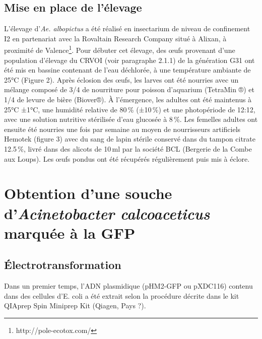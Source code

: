 \subsection{Mise en place de l'élevage}

L'élevage d'\textit{Ae. albopictus} a été réalisé en insectarium de niveau de confinement I2 en partenariat avec la Rovaltain Research Company situé à Alixan, à proximité de Valence\footnote{http://pole-ecotox.com/}. Pour débuter cet élevage, des œufs provenant d'une population d'élevage du CRVOI (voir paragraphe 2.1.1) de la génération G31 ont été mis en bassine contenant de l'eau déchlorée, à une température ambiante de 25°C (Figure 2). 
Après éclosion des œufs, les larves ont été nourries avec un mélange composé de 3/4 de nourriture pour poisson d'aquarium (TetraMin ®) et 1/4 de levure de bière (Biover®).
À l'émergence, les adultes ont été maintenus à 25°C ±1°C, une humidité relative de 80\,\% (±10\,\%) et une photopériode de 12:12, avec une solution nutritive stérilisée d'eau glucosée à 8\,\%. Les femelles adultes ont ensuite été nourries une fois par semaine au moyen de nourrisseurs artificiels Hemotek (figure 3) avec du sang de lapin stérile conservé dans du tampon citrate 12.5\,\%, livré dans des alicots de 10\,ml par la société BCL (Bergerie de la Combe aux Loups).
Les œufs pondus ont été récupérés régulièrement puis mis à éclore.

\section{Obtention d'une souche d'\textit{Acinetobacter calcoaceticus} marquée à la GFP}

\subsection{Électrotransformation}

Dans un premier temps, l'ADN plasmidique (pHM2-GFP ou pXDC116) contenu dans des cellules d'E. coli a été extrait selon la procédure décrite dans le kit QIAprep Spin Miniprep Kit (Qiagen, Pays ?).

